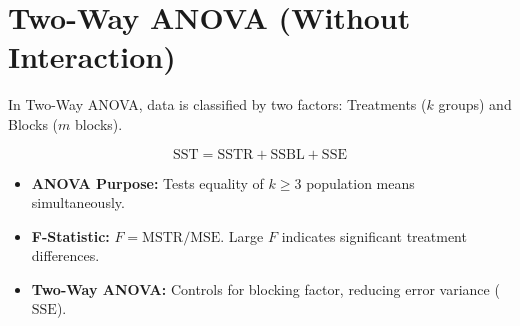 \documentclass[10pt,a4paper]{article}
\begin{document}
\section{Two-Way ANOVA (Without Interaction)}

In Two-Way ANOVA, data is classified by two factors: Treatments ($k$ groups) and Blocks ($m$ blocks).

\[
\text{SST} = \text{SSTR} + \text{SSBL} + \text{SSE}
\]

\begin{keytake}
\begin{itemize}
  \item \textbf{ANOVA Purpose:} Tests equality of $k \ge 3$ population means simultaneously.
  \item \textbf{F-Statistic:} $F = \text{MSTR} / \text{MSE}$. Large $F$ indicates significant treatment differences.
  \item \textbf{Two-Way ANOVA:} Controls for blocking factor, reducing error variance ($\text{SSE}$).
\end{itemize}
\end{keytake}
\end{document}
